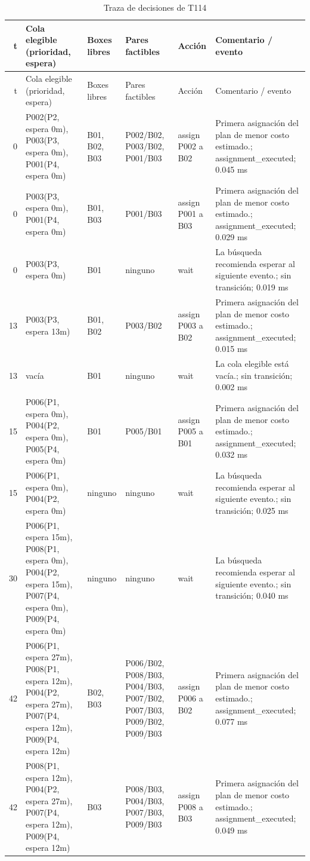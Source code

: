 \begin{longtable}{r p{3.0cm} p{1.25cm} p{2.7cm} p{2.0cm} p{2.4cm}}
\caption{Traza de decisiones de T114}\label{tab:trace_t114}\\
\toprule t & Cola elegible (prioridad, espera) & Boxes libres & Pares factibles & Acción & Comentario / evento \\
\midrule\endfirsthead
\toprule t & Cola elegible (prioridad, espera) & Boxes libres & Pares factibles & Acción & Comentario / evento \\
\midrule\endhead
0 & P002(P2, espera 0m), P003(P3, espera 0m), P001(P4, espera 0m) & B01, B02, B03 & P002/B02, P003/B02, P001/B03 & assign P002 a B02 & Primera asignación del plan de menor costo estimado.; assignment\_executed; 0.045 ms \\
0 & P003(P3, espera 0m), P001(P4, espera 0m) & B01, B03 & P001/B03 & assign P001 a B03 & Primera asignación del plan de menor costo estimado.; assignment\_executed; 0.029 ms \\
0 & P003(P3, espera 0m) & B01 & ninguno & wait & La búsqueda recomienda esperar al siguiente evento.; sin transición; 0.019 ms \\
13 & P003(P3, espera 13m) & B01, B02 & P003/B02 & assign P003 a B02 & Primera asignación del plan de menor costo estimado.; assignment\_executed; 0.015 ms \\
13 & vacía & B01 & ninguno & wait & La cola elegible está vacía.; sin transición; 0.002 ms \\
15 & P006(P1, espera 0m), P004(P2, espera 0m), P005(P4, espera 0m) & B01 & P005/B01 & assign P005 a B01 & Primera asignación del plan de menor costo estimado.; assignment\_executed; 0.032 ms \\
15 & P006(P1, espera 0m), P004(P2, espera 0m) & ninguno & ninguno & wait & La búsqueda recomienda esperar al siguiente evento.; sin transición; 0.025 ms \\
30 & P006(P1, espera 15m), P008(P1, espera 0m), P004(P2, espera 15m), P007(P4, espera 0m), P009(P4, espera 0m) & ninguno & ninguno & wait & La búsqueda recomienda esperar al siguiente evento.; sin transición; 0.040 ms \\
42 & P006(P1, espera 27m), P008(P1, espera 12m), P004(P2, espera 27m), P007(P4, espera 12m), P009(P4, espera 12m) & B02, B03 & P006/B02, P008/B03, P004/B03, P007/B02, P007/B03, P009/B02, P009/B03 & assign P006 a B02 & Primera asignación del plan de menor costo estimado.; assignment\_executed; 0.077 ms \\
42 & P008(P1, espera 12m), P004(P2, espera 27m), P007(P4, espera 12m), P009(P4, espera 12m) & B03 & P008/B03, P004/B03, P007/B03, P009/B03 & assign P008 a B03 & Primera asignación del plan de menor costo estimado.; assignment\_executed; 0.049 ms \\

\end{longtable}
